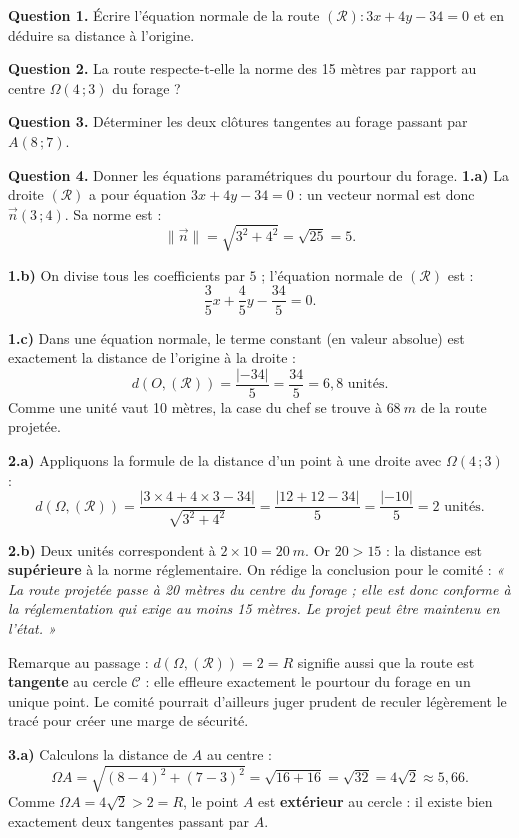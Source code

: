 \documentclass[11pt]{article}
\begin{document}
\begin{exoresolu}
\textbf{Question 1.} Écrire l'équation normale de la route $(\mathscr{R}) : 3x+4y-34=0$ et en déduire sa distance à l'origine.

\textbf{Question 2.} La route respecte-t-elle la norme des 15 mètres par rapport au centre $\Omega(4\,;3)$ du forage ?

\textbf{Question 3.} Déterminer les deux clôtures tangentes au forage passant par $A(8\,;7)$.

\textbf{Question 4.} Donner les équations paramétriques du pourtour du forage.
\tcblower
\textbf{1.a)} La droite $(\mathscr{R})$ a pour équation $3x+4y-34=0$ : un vecteur normal est donc $\vec{n}(3\,;4)$. Sa norme est :
\[ \|\vec{n}\| = \sqrt{3^2+4^2} = \sqrt{25} = 5. \]

\textbf{1.b)} On divise tous les coefficients par $5$ ; l'équation normale de $(\mathscr{R})$ est :
\[ \frac{3}{5}x + \frac{4}{5}y - \frac{34}{5} = 0. \]

\textbf{1.c)} Dans une équation normale, le terme constant (en valeur absolue) est exactement la distance de l'origine à la droite :
\[ d(O,(\mathscr{R})) = \frac{|-34|}{5} = \frac{34}{5} = 6{,}8 \text{ unités}. \]
Comme une unité vaut 10 mètres, la case du chef se trouve à $\SI{68}{m}$ de la route projetée.

\textbf{2.a)} Appliquons la formule de la distance d'un point à une droite avec $\Omega(4\,;3)$ :
\[ d(\Omega,(\mathscr{R})) = \frac{|3\times 4 + 4\times 3 - 34|}{\sqrt{3^2+4^2}} = \frac{|12+12-34|}{5} = \frac{|-10|}{5} = 2 \text{ unités}. \]

\textbf{2.b)} Deux unités correspondent à $2 \times 10 = \SI{20}{m}$. Or $20 > 15$ : la distance est \textbf{supérieure} à la norme réglementaire. On rédige la conclusion pour le comité : \emph{« La route projetée passe à 20 mètres du centre du forage ; elle est donc conforme à la réglementation qui exige au moins 15 mètres. Le projet peut être maintenu en l'état. »}

Remarque au passage : $d(\Omega,(\mathscr{R})) = 2 = R$ signifie aussi que la route est \textbf{tangente} au cercle $\mathscr{C}$ : elle effleure exactement le pourtour du forage en un unique point. Le comité pourrait d'ailleurs juger prudent de reculer légèrement le tracé pour créer une marge de sécurité.

\textbf{3.a)} Calculons la distance de $A$ au centre :
\[ \Omega A = \sqrt{(8-4)^2 + (7-3)^2} = \sqrt{16+16} = \sqrt{32} = 4\sqrt{2} \approx 5{,}66. \]
Comme $\Omega A = 4\sqrt{2} > 2 = R$, le point $A$ est \textbf{extérieur} au cercle : il existe bien exactement deux tangentes passant par $A$.


\end{exoresolu}
\end{document}
